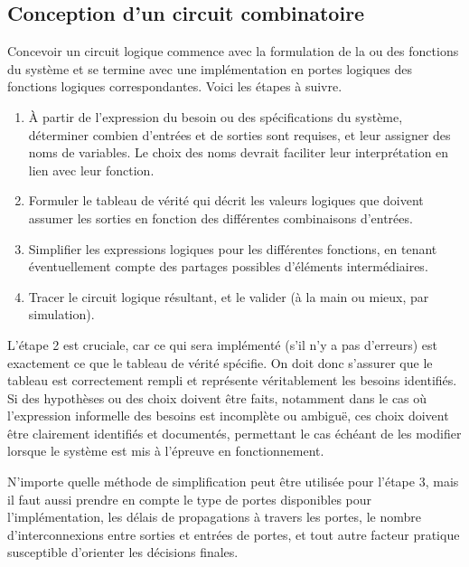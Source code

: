 \documentclass[11pt]{article}
\begin{document}
\subsection{Conception d'un circuit combinatoire}
\label{sec:org93c0bd5}

Concevoir un circuit logique commence avec la formulation de la ou des
fonctions du système et se termine avec une implémentation en portes
logiques des fonctions logiques correspondantes. Voici les étapes à
suivre.

\begin{enumerate}
\item À partir de l'expression du besoin ou des spécifications du
système, déterminer combien d'entrées et de sorties sont
requises, et leur assigner des noms de variables. Le choix des noms
devrait faciliter leur interprétation en lien avec leur fonction.

\item Formuler le tableau de vérité qui décrit les valeurs logiques que
doivent assumer les sorties en fonction des différentes
combinaisons d'entrées.

\item Simplifier les expressions logiques pour les différentes fonctions,
en tenant éventuellement compte des partages possibles d'éléments
intermédiaires.

\item Tracer le circuit logique résultant, et le valider (à la main ou
mieux, par simulation).
\end{enumerate}

L'étape 2 est cruciale, car ce qui sera implémenté (s'il n'y a pas
d'erreurs) est exactement ce que le tableau de vérité spécifie. On
doit donc s'assurer que le tableau est correctement rempli et
représente véritablement les besoins identifiés. Si des hypothèses ou
des choix doivent être faits, notamment dans le cas où l'expression
informelle des besoins est incomplète ou ambiguë, ces choix doivent
être clairement identifiés et documentés, permettant le cas échéant de
les modifier lorsque le système est mis à l'épreuve en fonctionnement.

N'importe quelle méthode de simplification peut être utilisée pour
l'étape 3, mais il faut aussi prendre en compte le type de portes
disponibles pour l'implémentation, les délais de propagations à
travers les portes, le nombre d'interconnexions entre sorties et
entrées de portes, et tout autre facteur pratique susceptible
d'orienter les décisions finales.
\end{document}
